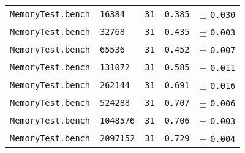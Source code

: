 \begin{tabular}{r|l|l|rl}
\texttt{MemoryTest.bench} & \texttt{16384} & \texttt{31} & \texttt{0.385} & \scriptsize $\pm$ \texttt{0.030}  \\
\texttt{MemoryTest.bench} & \texttt{32768} & \texttt{31} & \texttt{0.435} & \scriptsize $\pm$ \texttt{0.003}  \\
\texttt{MemoryTest.bench} & \texttt{65536} & \texttt{31} & \texttt{0.452} & \scriptsize $\pm$ \texttt{0.007}  \\
\texttt{MemoryTest.bench} & \texttt{131072} & \texttt{31} & \texttt{0.585} & \scriptsize $\pm$ \texttt{0.011}  \\
\texttt{MemoryTest.bench} & \texttt{262144} & \texttt{31} & \texttt{0.691} & \scriptsize $\pm$ \texttt{0.016}  \\
\texttt{MemoryTest.bench} & \texttt{524288} & \texttt{31} & \texttt{0.707} & \scriptsize $\pm$ \texttt{0.006}  \\
\texttt{MemoryTest.bench} & \texttt{1048576} & \texttt{31} & \texttt{0.706} & \scriptsize $\pm$ \texttt{0.003}  \\
\texttt{MemoryTest.bench} & \texttt{2097152} & \texttt{31} & \texttt{0.729} & \scriptsize $\pm$ \texttt{0.004}  \\
\end{tabular}